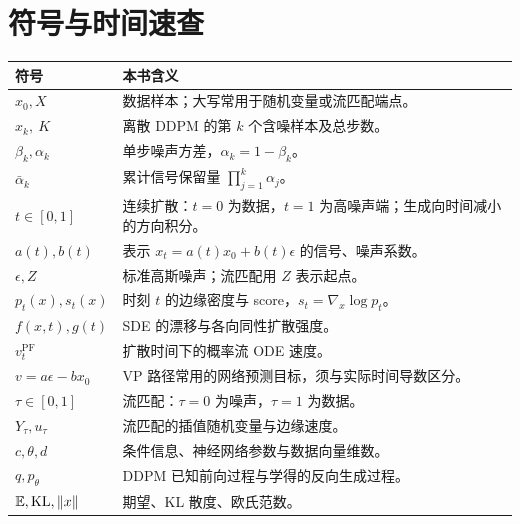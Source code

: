 \documentclass[lang=cn,chinesefont=nofont,scheme=chinese,11pt,
 color=blue,mode=fancy,device=pad,bibend=biber]{elegantbook}
\begin{document}
\chapter*{符号与时间速查}
\begin{longtable}{p{30mm}p{108mm}}
\toprule 符号 & 本书含义\\\midrule\endhead
$x_0, X$ & 数据样本；大写常用于随机变量或流匹配端点。\\
$x_k,\ K$ & 离散 DDPM 的第 $k$ 个含噪样本及总步数。\\
$\beta_k,\alpha_k$ & 单步噪声方差，$\alpha_k=1-\beta_k$。\\
$\bar\alpha_k$ & 累计信号保留量 $\prod_{j=1}^k\alpha_j$。\\
$t\in[0,1]$ & 连续扩散：$t=0$ 为数据，$t=1$ 为高噪声端；生成向时间减小的方向积分。\\
$a(t),b(t)$ & 表示 $x_t=a(t)x_0+b(t)\epsilon$ 的信号、噪声系数。\\
$\epsilon,Z$ & 标准高斯噪声；流匹配用 $Z$ 表示起点。\\
$p_t(x),s_t(x)$ & 时刻 $t$ 的边缘密度与 score，$s_t=\nabla_x\log p_t$。\\
$f(x,t),g(t)$ & SDE 的漂移与各向同性扩散强度。\\
$v_t^{\mathrm{PF}}$ & 扩散时间下的概率流 ODE 速度。\\
$v=a\epsilon-bx_0$ & VP 路径常用的网络预测目标，须与实际时间导数区分。\\
$\tau\in[0,1]$ & 流匹配：$\tau=0$ 为噪声，$\tau=1$ 为数据。\\
$Y_\tau,u_\tau$ & 流匹配的插值随机变量与边缘速度。\\
$c,\theta,d$ & 条件信息、神经网络参数与数据向量维数。\\
$q,p_\theta$ & DDPM 已知前向过程与学得的反向生成过程。\\
$\mathbb{E},\operatorname{KL},\left\lVert x\right\rVert$ & 期望、KL 散度、欧氏范数。\\
\bottomrule
\end{longtable}
\mainmatter
{}
\appendix
{}
\backmatter
\printbibliography[heading=bibintoc,title={参考文献与原始论文}]
\end{document}
